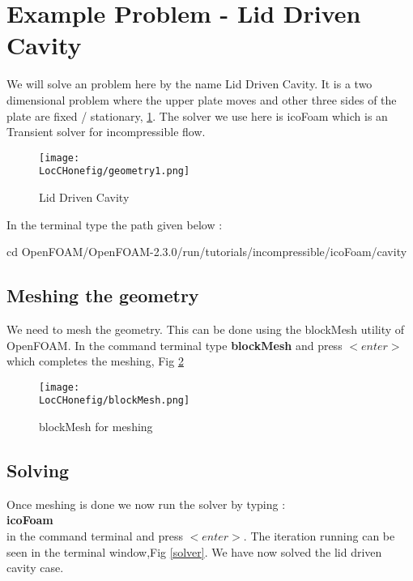 \section{Example Problem - Lid Driven Cavity}
We will solve an problem here by the name Lid Driven Cavity. It is a two dimensional problem where the upper plate moves and other three sides of the plate are fixed / stationary, \ref{lid}. 
The solver we use here is icoFoam which is an Transient solver for incompressible flow.

\begin{figure}[ht]  
\begin{center}  
\texttt{[image: \\LocCHonefig/geometry1.png]}
\caption{Lid Driven Cavity}
\label{lid}
\end{center}  
\end{figure}

In the terminal type the path given below :\newline

\small{cd OpenFOAM/OpenFOAM-2.3.0/run/tutorials/incompressible/icoFoam/cavity} \newline

\subsection*{Meshing the geometry}
We need to mesh the geometry. This can be done using the blockMesh utility of OpenFOAM. In the command terminal type \textbf{blockMesh} and press $<enter>$ which completes the meshing, Fig \ref{mesh}

\begin{figure}[ht]  
\begin{center}  
\texttt{[image: \\LocCHonefig/blockMesh.png]}
\caption{blockMesh for meshing}
\label{mesh}
\end{center}  
\end{figure}

\newpage

\subsection*{Solving}
Once meshing is done we now run the solver by typing : \\
\center \textbf{icoFoam} \\
\flushleft in the command terminal and press $<enter>$. The iteration running can be seen in the terminal window,Fig \ref{solver}. \newline
\flushleft We have now solved the lid driven cavity case.

